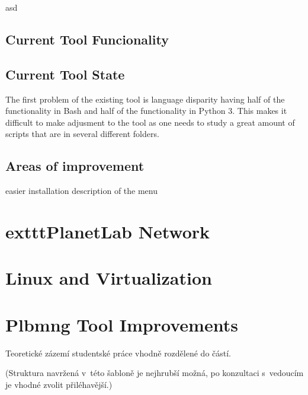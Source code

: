 asd
\section{Current Tool Funcionality}

\section{Current Tool State}
The first problem of the existing tool is language disparity having half of the functionality in Bash and half of the functionality in Python 3. This makes it difficult to make adjusment to the tool as one needs to study a great amount of scripts that are in several different folders. 
\section{Areas of improvement}
easier installation
description of the menu
\chapter{	exttt{PlanetLab} Network}
\label{chapter:	exttt{PlanetLab}network}

\chapter{Linux and Virtualization}
\label{chapter:Linux}

\chapter{Plbmng Tool Improvements}
\label{chapter:improve}

Teoretické zázemí studentské práce vhodně rozdělené do částí.

(Struktura navržená v~této šabloně je nejhrubší možná, po konzultaci s~vedoucím je vhodné zvolit přiléhavější.)
